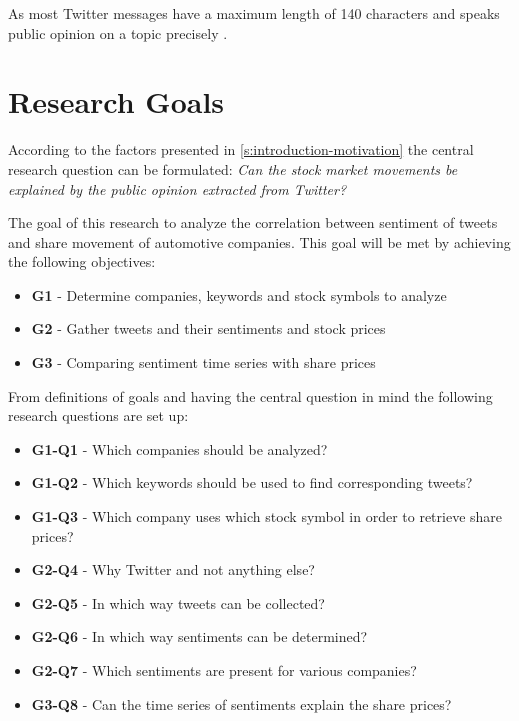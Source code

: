 As most Twitter messages have a maximum length of 140 characters and speaks public opinion on a topic precisely
\citep{Pagolu2016a}.

\section{Research Goals}
\label{s:introduction-researchgoals}

According to the factors presented in \cref{s:introduction-motivation} the central research question can be formulated:
\emph{Can the stock market movements be explained by the public opinion extracted from Twitter?}

The goal of this research to analyze the correlation between sentiment of tweets and share movement of automotive companies.
This goal will be met by achieving the following objectives:

\begin{itemize}
    \item \textbf{G1} - Determine companies, keywords and stock symbols to analyze
    \item \textbf{G2} - Gather tweets and their sentiments and stock prices
    \item \textbf{G3} - Comparing sentiment time series with share prices
\end{itemize}

From definitions of goals and having the central question in mind the following research questions are set up:

\begin{itemize}
    \item \textbf{G1-Q1} - Which companies should be analyzed?
    \item \textbf{G1-Q2} - Which keywords should be used to find corresponding tweets?
    \item \textbf{G1-Q3} - Which company uses which stock symbol in order to retrieve share prices?
    \item \textbf{G2-Q4} - Why Twitter and not anything else?
    \item \textbf{G2-Q5} - In which way tweets can be collected?
    \item \textbf{G2-Q6} - In which way sentiments can be determined?
    \item \textbf{G2-Q7} - Which sentiments are present for various companies?
	\item \textbf{G3-Q8} - Can the time series of sentiments explain the share prices?
\end{itemize}

